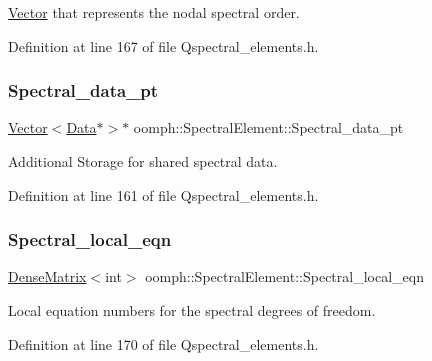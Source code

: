 \hyperlink{classoomph_1_1Vector}{Vector} that represents the nodal spectral order. 



Definition at line 167 of file Qspectral\+\_\+elements.\+h.

\mbox{\label{classoomph_1_1SpectralElement_a14f6bf98b6c49bd939d3ca9d25373b9c}} 
\subsubsection{\texorpdfstring{Spectral\+\_\+data\+\_\+pt}{Spectral\_data\_pt}}
{\footnotesize\ttfamily \hyperlink{classoomph_1_1Vector}{Vector}$<$\hyperlink{classoomph_1_1Data}{Data}$\ast$$>$$\ast$ oomph\+::\+Spectral\+Element\+::\+Spectral\+\_\+data\+\_\+pt\hspace{0.3cm}{\ttfamily [protected]}}



Additional Storage for shared spectral data. 



Definition at line 161 of file Qspectral\+\_\+elements.\+h.

\mbox{\label{classoomph_1_1SpectralElement_a24c7cd3b63fa81f059c959baa5e66f79}} 
\subsubsection{\texorpdfstring{Spectral\+\_\+local\+\_\+eqn}{Spectral\_local\_eqn}}
{\footnotesize\ttfamily \hyperlink{classoomph_1_1DenseMatrix}{Dense\+Matrix}$<$int$>$ oomph\+::\+Spectral\+Element\+::\+Spectral\+\_\+local\+\_\+eqn\hspace{0.3cm}{\ttfamily [protected]}}



Local equation numbers for the spectral degrees of freedom. 



Definition at line 170 of file Qspectral\+\_\+elements.\+h.

